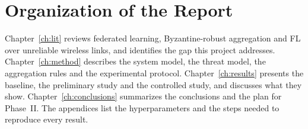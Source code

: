 \section{Organization of the Report}
Chapter~\ref{ch:lit} reviews federated learning, Byzantine-robust aggregation and FL
over unreliable wireless links, and identifies the gap this project addresses.
Chapter~\ref{ch:method} describes the system model, the threat model, the
aggregation rules and the experimental protocol. Chapter~\ref{ch:results} presents
the baseline, the preliminary study and the controlled study, and discusses what
they show. Chapter~\ref{ch:conclusions} summarizes the conclusions and the plan for
Phase~II. The appendices list the hyperparameters and the steps needed to reproduce
every result.
